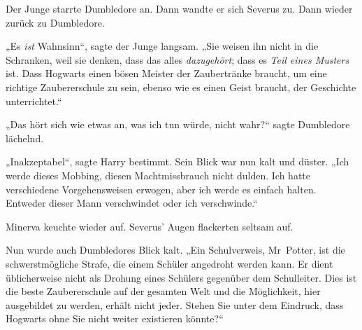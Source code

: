 Der Junge starrte Dumbledore an. Dann wandte er sich Severus zu. Dann wieder zurück zu Dumbledore.

„Es \emph{ist} Wahnsinn“, sagte der Junge langsam.
„Sie weisen ihn nicht in die Schranken, weil sie denken, dass das alles \emph{dazugehört}; dass es \emph{Teil eines Musters} ist. Dass Hogwarts einen bösen Meister der Zaubertränke braucht, um eine richtige Zaubererschule zu sein, ebenso wie es einen Geist braucht, der Geschichte unterrichtet.“

„Das hört sich wie etwas an, was ich tun würde, nicht wahr?“ sagte Dumbledore lächelnd.

„Inakzeptabel“, sagte Harry bestimmt. Sein Blick war nun kalt und düster.
„Ich werde dieses Mobbing, diesen Machtmissbrauch nicht dulden. Ich hatte verschiedene Vorgehensweisen erwogen, aber ich werde es einfach halten. Entweder dieser Mann verschwindet oder ich verschwinde.“

Minerva keuchte wieder auf. Severus’ Augen flackerten seltsam auf.

Nun wurde auch Dumbledores Blick kalt.
„Ein Schulverweis, Mr~Potter, ist die schwerstmögliche Strafe, die einem Schüler angedroht werden kann. Er dient üblicherweise nicht als Drohung eines Schülers gegenüber dem Schulleiter. Dies ist die beste Zaubererschule auf der gesamten Welt und die Möglichkeit, hier ausgebildet zu werden, erhält nicht jeder. Stehen Sie unter dem Eindruck, dass Hogwarts ohne Sie nicht weiter existieren könnte?“


